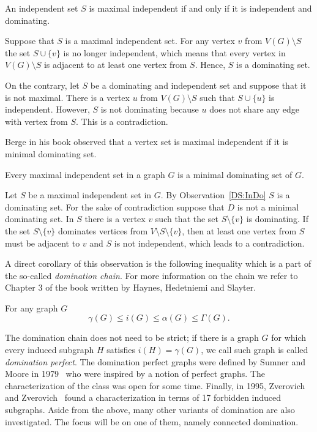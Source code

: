 \begin{obs}\label{DS:InDo}
	An independent set \(S\) is maximal independent if and only if it is independent and dominating.
\end{obs}
\begin{myproof}
	Suppose that \(S\) is a maximal independent set. For any vertex \(v\) from \(V(G) \setminus S\) the set \(S \cup \{v\}\) is no longer independent,
	which means that every vertex in \(V(G) \setminus S\) is adjacent to at least one vertex from \(S\).
	Hence, \(S\) is a dominating set.
	
	On the contrary, let \(S\) be a dominating and independent set and suppose that it is not maximal.
	There is a vertex \(u\) from \(V(G) \setminus S\) such that \(S \cup \{u\}\) is independent.
	However, \(S\) is not dominating because \(u\) does not share any edge with vertex from \(S\). 
	This is a contradiction.
\end{myproof}

Berge in his book \cite{Berge62} observed that a vertex set is maximal independent if it is minimal dominating set.

\begin{obs}
	Every maximal independent set in a graph \(G\) is a minimal dominating set of \(G\).
\end{obs}

\begin{myproof}
	Let \(S\) be a maximal independent set in \(G\). By Observation~\ref{DS:InDo} \(S\) is a dominating set.
	For the sake of contradiction suppose that \(D\) is not a minimal dominating set.
	In \(S\) there is a vertex \(v\) such that the set \(S \setminus \{v\}\) is dominating.
	If the set \(S \setminus \{v\}\) dominates vertices from \(V \setminus S \setminus \{v\}\), then at least one vertex from
	\(S\) must be adjacent to \(v\) and \(S\) is not independent, which leads to a contradiction.
\end{myproof}

A direct corollary of this observation is the following inequality which is a part of the so-called \emph{domination chain}.
For more information on the chain we refer to Chapter 3 of the book \cite{HaynesHedetniemiSlater98} written by Haynes, Hedetniemi and Slayter.
\begin{cor}
	For any graph \(G\)\:
	\[\gamma(G) \leq i(G) \leq \alpha(G) \leq \Gamma(G).\]
\end{cor}

The domination chain does not need to be strict; if there is a graph \(G\) for which every induced subgraph \(H\) satisfies \(i(H) = \gamma(G)\),
we call such graph is called \emph{domination perfect}.
The domination perfect graphs were defined by Sumner and Moore in 1979~\cite{SummerMoore79} who were inspired by a notion of perfect graphs.
The characterization of the class was open for some time. Finally, in 1995, Zverovich and Zverovich~\cite{ZverovichZverovich95} found a characterization in terms of 17 forbidden induced subgraphs.
Aside from the above, many other variants of domination are also investigated. The focus will be on one of them, namely connected domination.

